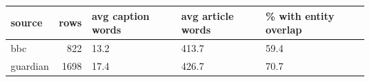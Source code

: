 \begin{tabular}{lrlll}
\toprule
source & rows & avg caption words & avg article words & \% with entity overlap \\
\midrule
bbc & 822 & 13.2 & 413.7 & 59.4 \\
guardian & 1698 & 17.4 & 426.7 & 70.7 \\
\bottomrule
\end{tabular}

